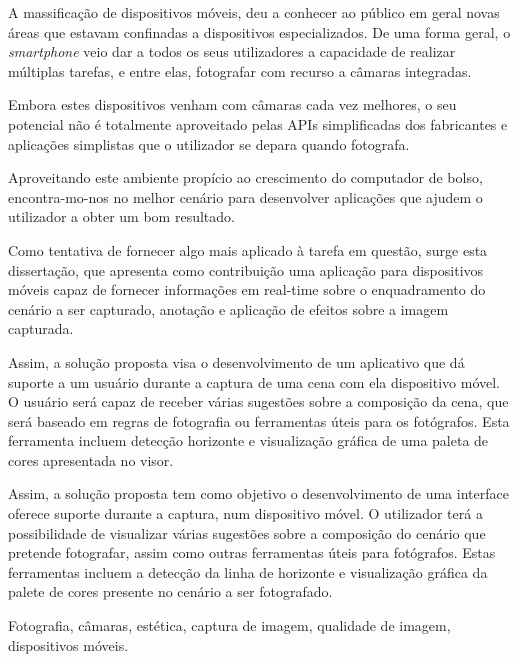 \abstractPT 
{}

A massificação de dispositivos móveis, deu a conhecer ao público em geral novas áreas que estavam confinadas a dispositivos especializados. De uma forma geral, o \emph{smartphone} veio dar a todos os seus utilizadores a capacidade de realizar múltiplas tarefas, e entre elas, fotografar com recurso a câmaras integradas.


Embora estes dispositivos venham com câmaras cada vez melhores, o seu potencial não é totalmente aproveitado pelas APIs simplificadas dos fabricantes e aplicações simplistas que o utilizador se depara quando fotografa.


Aproveitando este ambiente propício ao crescimento do computador de bolso, encontra-mo-nos no melhor cenário para desenvolver aplicações que ajudem o utilizador a obter um bom resultado.


Como tentativa de fornecer algo mais aplicado à tarefa em questão, surge esta dissertação, que apresenta como contribuição uma aplicação para dispositivos móveis capaz de fornecer informações em real-time sobre o enquadramento do cenário a ser capturado, anotação e aplicação de efeitos sobre a imagem capturada.



Assim, a solução proposta visa o desenvolvimento de um aplicativo que dá suporte a um usuário durante a captura de uma cena com ela dispositivo móvel. O usuário será capaz de receber várias sugestões sobre a composição da cena, que será baseado em regras de fotografia ou ferramentas úteis para os fotógrafos. Esta ferramenta incluem detecção horizonte e visualização gráfica de uma paleta de cores apresentada no visor.

Assim, a solução proposta tem como objetivo o desenvolvimento de uma interface oferece suporte durante a captura, num dispositivo móvel. O utilizador terá a possibilidade de visualizar várias sugestões sobre a composição do cenário que pretende fotografar, assim como outras ferramentas úteis para fotógrafos. Estas ferramentas incluem a detecção da linha de horizonte e visualização gráfica da palete de cores presente no cenário a ser fotografado.

\begin{keywords}
Fotografia, câmaras, estética, captura de imagem, qualidade de imagem, dispositivos móveis.
\end{keywords}
